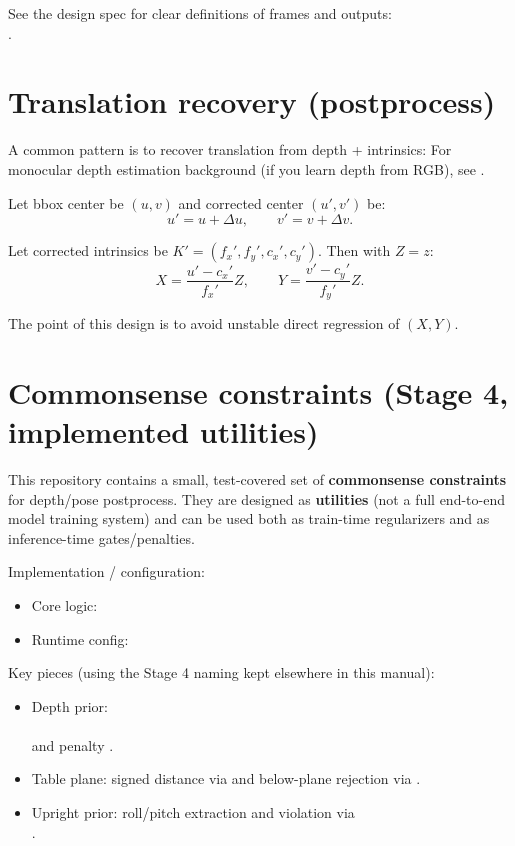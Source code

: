 See the design spec for clear definitions of frames and outputs:\\
.

\section{Translation recovery (postprocess)}
A common pattern is to recover translation from depth + intrinsics:
For monocular depth estimation background (if you learn depth from RGB), see \cite{eigen2014depth,ranftl2021dpt}.

Let bbox center be $(u,v)$ and corrected center $(u',v')$ be:
$$
  u' = u + \Delta u, \qquad v' = v + \Delta v.
$$

Let corrected intrinsics be $K'=(f_x', f_y', c_x', c_y')$.
Then with $Z=z$:
$$
  X = \frac{u' - c_x'}{f_x'} Z, \qquad
  Y = \frac{v' - c_y'}{f_y'} Z.
$$

The point of this design is to avoid unstable direct regression of $(X,Y)$.

\section{Commonsense constraints (Stage 4, implemented utilities)}
This repository contains a small, test-covered set of \textbf{commonsense constraints} for depth/pose postprocess.
They are designed as \textbf{utilities} (not a full end-to-end model training system) and can be used both as
train-time regularizers and as inference-time gates/penalties.

Implementation / configuration:
\begin{itemize}
  \item Core logic: 
  \item Runtime config: 
\end{itemize}

Key pieces (using the Stage 4 naming kept elsewhere in this manual):
\begin{itemize}
  \item Depth prior: \\
     \\
    and penalty .
  \item Table plane: signed distance via 
    and below-plane rejection via .
  \item Upright prior: roll/pitch extraction and violation via \\
    .
\end{itemize}

